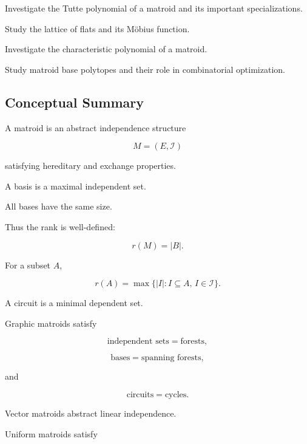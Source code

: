 \begin{exercise}[4]
Investigate the Tutte polynomial of a matroid and its important
specializations.
\end{exercise}

\begin{exercise}[4]
Study the lattice of flats and its Möbius function.
\end{exercise}

\begin{exercise}[4]
Investigate the characteristic polynomial of a matroid.
\end{exercise}

\begin{exercise}[4]
Study matroid base polytopes and their role in combinatorial
optimization.
\end{exercise}

\subsection{Conceptual Summary}
\label{subsec:matroid-summary}

A matroid is an abstract independence structure

\[
\boxed{
M=(E,\mathcal{I})
}
\]

satisfying hereditary and exchange properties.

A basis is a maximal independent set.

All bases have the same size.

Thus the rank is well-defined:

\[
\boxed{
r(M)=|B|.
}
\]

For a subset \(A\),

\[
\boxed{
r(A)
=
\max
\{
|I|:
I\subseteq A,\,
I\in\mathcal{I}
\}.
}
\]

A circuit is a minimal dependent set.

Graphic matroids satisfy

\[
\boxed{
\text{independent sets}
=
\text{forests},
}
\]

\[
\boxed{
\text{bases}
=
\text{spanning forests},
}
\]

and

\[
\boxed{
\text{circuits}
=
\text{cycles}.
}
\]

Vector matroids abstract linear independence.

Uniform matroids satisfy

